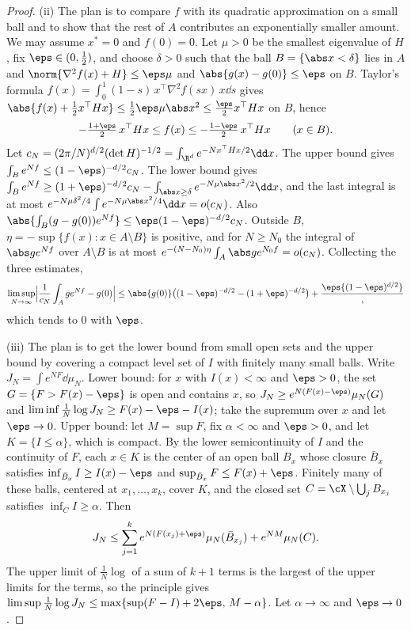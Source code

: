 \begin{refsection}
\begin{proof}
(ii) The plan is to compare $f$ with its quadratic approximation on a small ball and to show that the rest of $A$ contributes an exponentially smaller amount. We may assume $x^*=0$ and $f(0)=0$. Let $\mu>0$ be the smallest eigenvalue of $H$, fix $\eps\in(0,\frac12)$, and choose $\delta>0$ such that the ball $B=\{\abs x<\delta\}$ lies in $A$ and $\norm{\nabla^2f(x)+H}\le\eps\mu$ and $\abs{g(x)-g(0)}\le\eps$ on $B$. Taylor's formula $f(x)=\int_0^1(1-s)\,x^\top\nabla^2f(sx)\,x\dd s$ gives $\abs{f(x)+\frac12x^\top Hx}\le\frac12\eps\mu\abs x^2\le\frac\eps2x^\top Hx$ on $B$, hence
\[
-\tfrac{1+\eps}2\,x^\top Hx\le f(x)\le-\tfrac{1-\eps}2\,x^\top Hx\qquad(x\in B).
\]
Let $c_N=(2\pi/N)^{d/2}(\det H)^{-1/2}=\int_{\R^d}e^{-Nx^\top Hx/2}\dd x$. The upper bound gives $\int_Be^{Nf}\le(1-\eps)^{-d/2}c_N$. The lower bound gives $\int_Be^{Nf}\ge(1+\eps)^{-d/2}c_N-\int_{\abs x\ge\delta}e^{-N\mu\abs x^2/2}\dd x$, and the last integral is at most $e^{-N\mu\delta^2/4}\int e^{-N\mu\abs x^2/4}\dd x=o(c_N)$. Also $\abs{\int_B(g-g(0))e^{Nf}}\le\eps(1-\eps)^{-d/2}c_N$. Outside $B$, $\eta=-\sup\{f(x):x\in A\setminus B\}$ is positive, and for $N\ge N_0$ the integral of $\abs ge^{Nf}$ over $A\setminus B$ is at most $e^{-(N-N_0)\eta}\int_A\abs ge^{N_0f}=o(c_N)$. Collecting the three estimates,
\[
\limsup_{N\to\infty}\Bigl\lvert\frac1{c_N}\int_Age^{Nf}-g(0)\Bigr\rvert\le\abs{g(0)}\bigl((1-\eps)^{-d/2}-(1+\eps)^{-d/2}\bigr)+\frac\eps{(1-\eps)^{d/2}},
\]
which tends to $0$ with $\eps$.

(iii) The plan is to get the lower bound from small open sets and the upper bound by covering a compact level set of $I$ with finitely many small balls. Write $J_N=\int e^{NF}\dd\mu_N$. Lower bound: for $x$ with $I(x)<\infty$ and $\eps>0$, the set $G=\{F>F(x)-\eps\}$ is open and contains $x$, so $J_N\ge e^{N(F(x)-\eps)}\mu_N(G)$ and $\liminf\frac1N\log J_N\ge F(x)-\eps-I(x)$; take the supremum over $x$ and let $\eps\to0$. Upper bound: let $M=\sup F$, fix $\alpha<\infty$ and $\eps>0$, and let $K=\{I\le\alpha\}$, which is compact. By the lower semicontinuity of $I$ and the continuity of $F$, each $x\in K$ is the center of an open ball $B_x$ whose closure $\bar B_x$ satisfies $\inf_{\bar B_x}I\ge I(x)-\eps$ and $\sup_{\bar B_x}F\le F(x)+\eps$. Finitely many of these balls, centered at $x_1,\dots,x_k$, cover $K$, and the closed set $C=\cX\setminus\bigcup_jB_{x_j}$ satisfies $\inf_CI\ge\alpha$. Then
\[
J_N\le\sum_{j=1}^ke^{N(F(x_j)+\eps)}\mu_N(\bar B_{x_j})+e^{NM}\mu_N(C).
\]
The upper limit of $\frac1N\log$ of a sum of $k+1$ terms is the largest of the upper limits for the terms, so the principle gives $\limsup\frac1N\log J_N\le\max\{\sup(F-I)+2\eps,\,M-\alpha\}$. Let $\alpha\to\infty$ and $\eps\to0$.
\end{proof}


\end{refsection}
